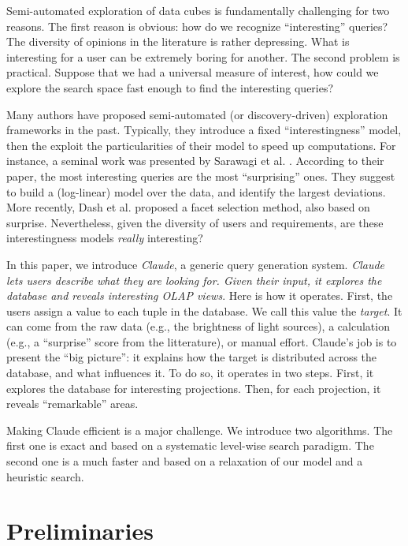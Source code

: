 Semi-automated exploration of data cubes is fundamentally challenging for two
reasons. The first reason is obvious: how do we recognize ``interesting''
queries?  The diversity of opinions in the literature is rather depressing.
What is interesting for a user can be extremely boring for another. The second
problem is practical.  Suppose that we had a universal measure of interest, how
could we explore the search space fast enough to find the interesting queries?

Many authors have proposed semi-automated (or discovery-driven) exploration
frameworks in the past. Typically, they introduce a fixed ``interestingness''
model, then the exploit the particularities of their model to speed up
computations.  For instance, a seminal work was presented by Sarawagi et al.
\cite{sarawagi1998discovery}. According to their paper, the most interesting
queries are the most ``surprising'' ones.  They suggest to build a (log-linear)
model over the data, and identify the largest deviations. More recently, Dash
et al.\cite{dash2008dynamic} proposed a facet selection method, also based on
surprise. Nevertheless, given the diversity of users and requirements, are
these interestingness models \emph{really} interesting?

In this paper, we introduce \textit{Claude}, a generic query generation
system. \emph{Claude lets users describe what they are looking for.
Given their input, it explores the database and reveals interesting OLAP views}.
Here is how it operates. First, the users assign a value to each tuple in
the database.  We call this value the \emph{target}. It can come from the raw
data (e.g., the brightness of light sources), a calculation (e.g., a
``surprise'' score from the litterature), or manual effort. Claude's job is to
present the ``big picture'': it explains how the target is distributed across
the database, and what influences it. To do so, it operates in two steps.
First, it explores the database for interesting projections. Then, for each
projection, it reveals ``remarkable'' areas. 

Making Claude efficient is a major challenge. We
introduce two algorithms.  The first one is exact and based on a systematic
level-wise search paradigm.  The second one is a much faster and based on a
relaxation of our model and a heuristic search.

\section{Preliminaries}

